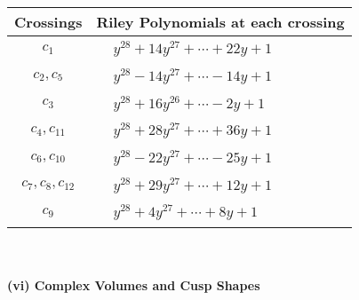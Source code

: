 \documentclass[1p]{elsarticle_modified}
\theoremstyle{definition}
\begin{document}
\begin{tabular}{m{50pt}|m{274pt}}
Crossings & \hspace{64pt}Riley Polynomials at each crossing \\
\hline $$\begin{aligned}c_{1}\end{aligned}$$&$\begin{aligned}
&y^{28}+14 y^{27}+\cdots+22 y+1
\end{aligned}$\\
\hline $$\begin{aligned}c_{2},c_{5}\end{aligned}$$&$\begin{aligned}
&y^{28}-14 y^{27}+\cdots-14 y+1
\end{aligned}$\\
\hline $$\begin{aligned}c_{3}\end{aligned}$$&$\begin{aligned}
&y^{28}+16 y^{26}+\cdots-2 y+1
\end{aligned}$\\
\hline $$\begin{aligned}c_{4},c_{11}\end{aligned}$$&$\begin{aligned}
&y^{28}+28 y^{27}+\cdots+36 y+1
\end{aligned}$\\
\hline $$\begin{aligned}c_{6},c_{10}\end{aligned}$$&$\begin{aligned}
&y^{28}-22 y^{27}+\cdots-25 y+1
\end{aligned}$\\
\hline $$\begin{aligned}c_{7},c_{8},c_{12}\end{aligned}$$&$\begin{aligned}
&y^{28}+29 y^{27}+\cdots+12 y+1
\end{aligned}$\\
\hline $$\begin{aligned}c_{9}\end{aligned}$$&$\begin{aligned}
&y^{28}+4 y^{27}+\cdots+8 y+1
\end{aligned}$\\
\hline
\end{tabular}\\~\\
\newpage\flushleft \textbf{(vi) Complex Volumes and Cusp Shapes}
\end{document}
